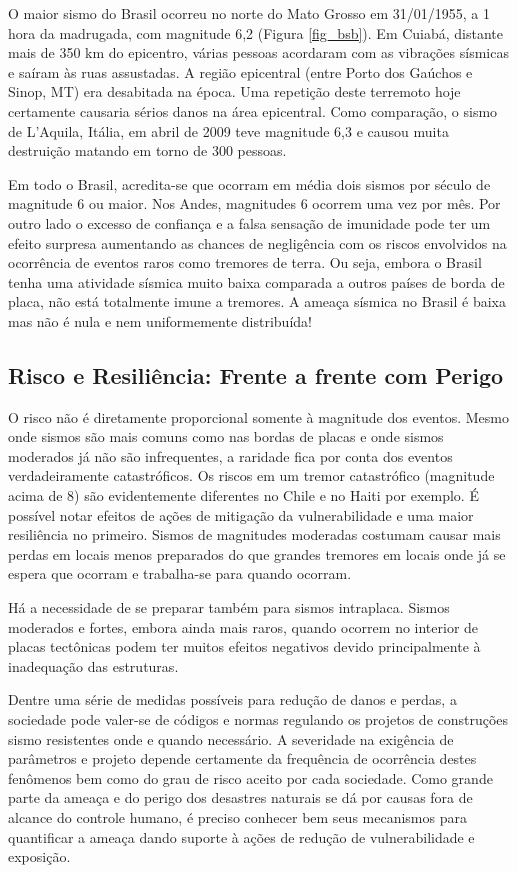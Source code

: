 \documentclass[jgrga]{agutex}
\begin{document}
\begin{article}
O maior sismo do Brasil ocorreu no norte do Mato Grosso em 31/01/1955, a 1 hora da madrugada, com magnitude 6,2 (Figura \ref{fig_bsb}). Em Cuiabá, distante mais de 350 km do epicentro, várias pessoas acordaram com as vibrações sísmicas e saíram às ruas assustadas. A região epicentral (entre Porto dos Gaúchos e Sinop, MT) era desabitada na época. Uma repetição deste terremoto hoje certamente causaria sérios danos na área epicentral. Como comparação, o sismo de L’Aquila, Itália, em abril de 2009 teve magnitude 6,3 e causou muita destruição matando em torno de 300 pessoas. 

Em todo o Brasil, acredita-se que ocorram em média dois sismos por século de magnitude 6 ou maior. Nos Andes, magnitudes 6 ocorrem uma vez por mês. Por outro lado o excesso de confiança e a falsa sensação de imunidade pode ter um efeito surpresa aumentando as chances de negligência com os riscos envolvidos na ocorrência de eventos raros como tremores de terra. Ou seja, embora o Brasil tenha uma atividade sísmica muito baixa comparada a outros países de borda de placa, não está totalmente imune a tremores. A ameaça sísmica no Brasil é baixa mas não é nula e nem uniformemente distribuída!

\subsection{Risco e Resili\^encia: Frente a frente com Perigo}

O risco não é diretamente proporcional somente à magnitude dos eventos. Mesmo onde sismos são mais comuns como nas bordas de placas e onde sismos moderados já não são infrequentes, a raridade fica por conta dos eventos verdadeiramente catastróficos. Os riscos em um tremor catastrófico (magnitude acima de 8) são evidentemente diferentes no Chile e no Haiti por exemplo. É possível notar efeitos de ações de mitigação da vulnerabilidade e uma maior resiliência no primeiro. Sismos de magnitudes moderadas costumam causar mais perdas em locais menos preparados do que grandes tremores em locais onde já se espera que ocorram e trabalha-se para quando ocorram.

Há a necessidade de se preparar também para sismos intraplaca. Sismos moderados e fortes, embora ainda mais raros, quando ocorrem no interior de placas tectônicas podem ter muitos efeitos negativos devido principalmente à inadequação das estruturas. 

Dentre uma série de medidas possíveis para redução de danos e perdas, a sociedade pode valer-se de códigos e normas regulando os projetos de construções sismo resistentes onde e quando necessário. A severidade na exigência de parâmetros e projeto depende certamente da frequência de ocorrência destes fenômenos bem como do grau de risco aceito por cada sociedade. Como grande parte da ameaça e do perigo dos desastres naturais se dá por causas fora de alcance do controle humano, é preciso conhecer bem seus mecanismos para quantificar a ameaça dando suporte à ações de redução de vulnerabilidade e exposição. 


\end{article}
\end{document}
